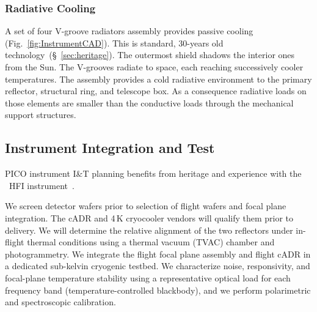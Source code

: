 \subsubsection{Radiative Cooling}
\label{sec:radiative_cooling} %

A set of four V-groove radiators assembly provides passive cooling (Fig.~\ref{fig:InstrumentCAD}). This is standard, 30-years old technology~(\S~\ref{sec:heritage}). The outermost shield shadows the interior ones from the Sun. The V-grooves radiate to space, each reaching successively cooler temperatures.
The assembly provides a cold radiative environment to the primary reflector, structural ring, and telescope box. As a consequence radiative loads on those elements are smaller than the conductive loads through the mechanical support structures.


\subsection{Instrument Integration and Test}
\label{sec:iandt} %

PICO instrument I\&T planning benefits from heritage and experience with the \planck\ HFI instrument~\citep{Pajot2010}.

We screen detector wafers prior to selection of flight wafers and focal plane integration. The cADR and 4\,K cryocooler vendors will qualify them prior to delivery. We will determine the relative alignment of the two reflectors under in-flight thermal conditions using a thermal vacuum (TVAC) chamber and photogrammetry. We integrate the flight focal plane assembly and flight cADR in a dedicated sub-kelvin cryogenic testbed. We characterize noise, responsivity, and focal-plane temperature stability using a representative optical load for each frequency band (temperature-controlled blackbody), and we perform polarimetric and spectroscopic calibration.



